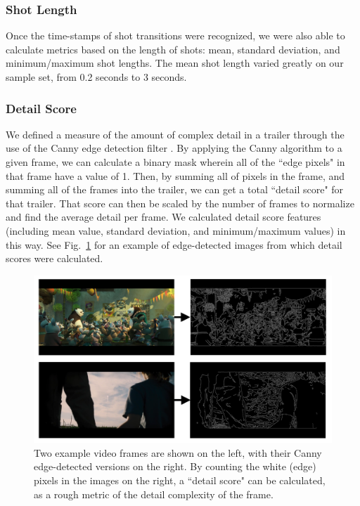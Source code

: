 \documentclass[letterpaper, 10 pt, conference]{ieeeconf}  %
\begin{document}
\subsubsection{Shot Length}
Once the time-stamps of shot transitions were recognized, we were also able to calculate metrics based on the length of shots: mean, standard deviation, and minimum/maximum shot lengths. The mean shot length varied greatly on our sample set, from 0.2 seconds to 3 seconds.

\subsubsection{Detail Score}
We defined a measure of the amount of complex detail in a trailer through the use of the Canny edge detection filter \cite{canny}. By applying the Canny algorithm to a given frame, we can calculate a binary mask wherein all of the ``edge pixels" in that frame have a value of 1. Then, by summing all of pixels in the frame, and summing all of the frames into the trailer, we can get a total ``detail score" for that trailer. That score can then be scaled by the number of frames to normalize and find the average detail per frame. We calculated detail score features (including mean value, standard deviation, and minimum/maximum values) in this way. See Fig.~\ref{f:canny_combined} for an example of edge-detected images from which detail scores were calculated.

\begin{figure}[h]
	\centering
	\includegraphics[width=\columnwidth]{canny_combined.png}
	\caption{Two example video frames are shown on the left, with their Canny edge-detected versions on the right. By counting the white (edge) pixels in the images on the right, a ``detail score" can be calculated, as a rough metric of the detail complexity of the frame.}
	\label{f:canny_combined}
\end{figure}
\end{document}
